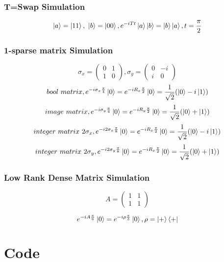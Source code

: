 \documentclass{article}
\begin{document}
\subsubsection{T=Swap Simulation}
	$$ \ket{a}=\ket{11},\ \ket{b}=\ket{00}, e^{-iTt}\ket{a}\ket{b} = \ket{b}\ket{a}, t=\frac{\pi}{2} $$
\subsubsection{1-sparse matrix Simulation}
$$ \sigma_x =\left(\begin{matrix}
	0 & 1 \\
	1& 0
	\end{matrix}\right),
	\sigma_y = \left(\begin{matrix}
	0 & -i \\
	i & 0 
	\end{matrix}\right)
	$$
	$$ bool\  matrix, e^{-i\sigma_x \frac{\pi}{4} }\ket{0}=e^{-iR_x \frac{\pi}{2} }\ket{0} = \frac{1}{\sqrt{2}}(\ket{0}-i\ket{1}) $$
	$$ image \  matrix, e^{-i\sigma_y \frac{\pi}{4} }\ket{0}=e^{-iR_y \frac{\pi}{2} }\ket{0} = \frac{1}{\sqrt{2}}(\ket{0}+\ket{1}) $$	
	$$ integer\ matrix\  2\sigma_x, e^{-i2\sigma_x \frac{\pi}{8} }\ket{0}=e^{-iR_x \frac{\pi}{2} }\ket{0} = \frac{1}{\sqrt{2}}(\ket{0}-i\ket{1}) $$
	$$ integer\ matrix\  2\sigma_y, e^{-i2\sigma_y \frac{\pi}{8} }\ket{0}=e^{-iR_x \frac{\pi}{2} }\ket{0} = \frac{1}{\sqrt{2}}(\ket{0}+\ket{1}) $$
\subsubsection{Low Rank Dense Matrix Simulation}
$$ A=\begin{pmatrix}
1 &1 \\
1 & 1
\end{pmatrix}$$

$$ e^{-iA\frac{\pi}{6}}\ket{0} = e^{-i\rho\frac{\pi}{3}}\ket{0}, \rho = \ket{+}\bra{+}$$
\section{Code}
\end{document}
